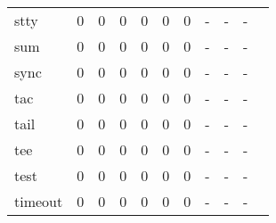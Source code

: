 \begin{longtable}{lp{1.10cm}p{1.10cm}p{1.10cm}p{1.10cm}p{1.10cm}p{1.10cm}p{1.10cm}p{1.10cm}p{1.10cm}p{1.10cm}}
stty      &                      0 &                                  0 &                                 0 &                                0 &                                 0 &                               0 &                              - &                                     - &                                   - \\
sum       &                      0 &                                  0 &                                 0 &                                0 &                                 0 &                               0 &                              - &                                     - &                                   - \\
sync      &                      0 &                                  0 &                                 0 &                                0 &                                 0 &                               0 &                              - &                                     - &                                   - \\
tac       &                      0 &                                  0 &                                 0 &                                0 &                                 0 &                               0 &                              - &                                     - &                                   - \\
tail      &                      0 &                                  0 &                                 0 &                                0 &                                 0 &                               0 &                              - &                                     - &                                   - \\
tee       &                      0 &                                  0 &                                 0 &                                0 &                                 0 &                               0 &                              - &                                     - &                                   - \\
test      &                      0 &                                  0 &                                 0 &                                0 &                                 0 &                               0 &                              - &                                     - &                                   - \\
timeout   &                      0 &                                  0 &                                 0 &                                0 &                                 0 &                               0 &                              - &                                     - &                                   - \\

\end{longtable}
